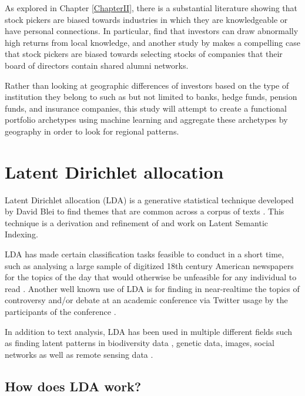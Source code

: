 As explored in Chapter \ref{ChapterII}, there is a substantial literature showing that stock pickers are biased towards industries in which they are knowledgeable or have personal connections.  In particular, \cite{covalthe2001} find that investors can draw abnormally high returns from local knowledge, and another study by \cite{Cohen2008} makes a compelling case that stock pickers are biased towards selecting stocks of companies that their board of directors contain shared alumni networks.  

Rather than looking at geographic differences of investors based on the type of institution they belong to such as but not limited to banks, hedge funds, pension funds, and insurance companies, this study will attempt to create a functional portfolio archetypes using machine learning and aggregate these archetypes by geography in order to look for regional patterns.   

\section{Latent Dirichlet allocation}


Latent Dirichlet allocation (LDA)  is a generative statistical technique developed by David Blei to find themes that are common across a corpus of texts \citep{blei2003latent}.  This technique is a derivation and refinement of \cite{Papadimitriou98} and \cite{PAPADIMITRIOU2000217} work on Latent Semantic Indexing.  

LDA has made certain classification tasks feasible to conduct in a short time, such as analysing a large sample of digitized 18th century American newspapers for the topics of the day that would otherwise be unfeasible for any individual to read \citep{newman2006probabilistic}.  Another well known use of LDA is for finding in near-realtime the topics of controversy and/or debate at an academic conference via Twitter usage by the participants of the conference \citep{Marwick2013}.

In addition to text analysis, LDA has been used in multiple different fields such as finding latent patterns in biodiversity data \citep{Vale2014}, genetic data, images, social networks \citep{Blei2012} as well as remote sensing data \cite{Lienou2010}.

\subsection{How does LDA work?}

